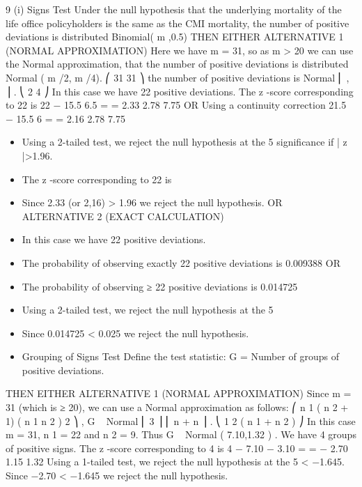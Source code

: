 \documentclass[a4paper,12pt]{article}
\begin{document}
\begin{enumerate}
\begin{enumerate}[(i)]

\newpage

9
(i)
Signs Test
Under the null hypothesis that the underlying mortality of the life office policyholders
is the same as the CMI mortality,
the number of positive deviations is distributed Binomial( m ,0.5)
THEN EITHER ALTERNATIVE 1 (NORMAL APPROXIMATION)
Here we have m = 31, so as m > 20 we can use the Normal approximation, that the
number of positive deviations is distributed Normal ( m /2, m /4).
⎛ 31 31 ⎞
the number of positive deviations is Normal ⎜ , ⎟ .
⎝ 2 4 ⎠
In this case we have 22 positive deviations.
The z -score corresponding to 22 is
22 − 15.5 6.5
=
= 2.33
2.78
7.75
OR Using a continuity correction
21.5 − 15.5
6
=
= 2.16
2.78
7.75
\begin{itemize}
\item Using a 2-tailed test, we reject the null hypothesis at the 5%
significance if | z |>1.96.
\item The z -score corresponding to 22 is
\item Since 2.33 (or 2,16) > 1.96 we reject the null hypothesis.
OR ALTERNATIVE 2 (EXACT CALCULATION)
\item In this case we have 22 positive deviations.
\item The probability of observing exactly 22 positive deviations is 0.009388
OR
\item The probability of observing ≥ 22 positive deviations is 0.014725
\item Using a 2-tailed test, we reject the null hypothesis at the 5%
\item Since 0.014725 < 0.025 we reject the null hypothesis.
\item Grouping of Signs Test
Define the test statistic:
G = Number of groups of positive deviations.
\end{itemize}
THEN EITHER ALTERNATIVE 1 (NORMAL APPROXIMATION)
Since m = 31 (which is ≥ 20), we can use a Normal approximation as follows:
⎛ n 1 ( n 2 + 1) ( n 1 n 2 ) 2 ⎞
,
G ~ Normal ⎜
3 ⎟
⎜ n + n
⎟ .
⎝ 1 2 ( n 1 + n 2 ) ⎠
In this case m = 31, n 1 = 22 and n 2 = 9.
Thus G ~ Normal ( 7.10,1.32 ) .
We have 4 groups of positive signs.
The z -score corresponding to 4 is
4 − 7.10 − 3.10
=
= − 2.70
1.15
1.32
Using a 1-tailed test, we reject the null hypothesis at the 5%
< −1.645.
Since −2.70 < −1.645 we reject the null hypothesis.

\end{enumerate}
\end{enumerate}
\end{document}

